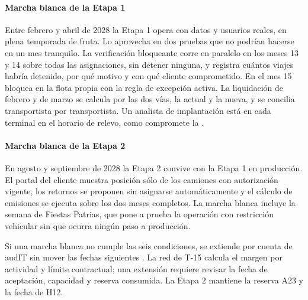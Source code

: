 \paragraph{Marcha blanca de la Etapa 1}
Entre febrero y abril de 2028 la Etapa 1 opera con datos y usuarios reales, en plena temporada de fruta.
Lo aprovecha en dos pruebas que no podrían hacerse en un mes tranquilo. La verificación bloqueante corre en
paralelo en los meses 13 y 14 sobre todas las asignaciones, sin detener ninguna, y registra cuántos viajes
habría detenido, por qué motivo y con qué cliente comprometido. En el mes 15 bloquea en la flota propia con
la regla de excepción activa. La liquidación de febrero y de marzo se calcula por las dos vías, la actual y
la nueva, y se concilia transportista por transportista. Un analista de implantación está en cada
terminal en el horario de relevo, como compromete la .

\paragraph{Marcha blanca de la Etapa 2}
En agosto y septiembre de 2028 la Etapa 2 convive con la Etapa 1 en producción. El portal del cliente
muestra posición sólo de los camiones con autorización vigente, los retornos se proponen sin asignarse
automáticamente y el cálculo de emisiones se ejecuta sobre los dos meses completos. La marcha blanca
incluye la semana de Fiestas Patrias, que pone a prueba la operación con restricción vehicular sin que
ocurra ningún paso a producción.

Si una marcha blanca no cumple las seis condiciones, se extiende por cuenta de audIT sin mover las fechas
siguientes . La red de T-15 calcula el margen por actividad y límite contractual; una extensión requiere revisar la fecha de aceptación, capacidad y reserva consumida. La Etapa 2 mantiene la reserva A23 y la fecha de H12.
